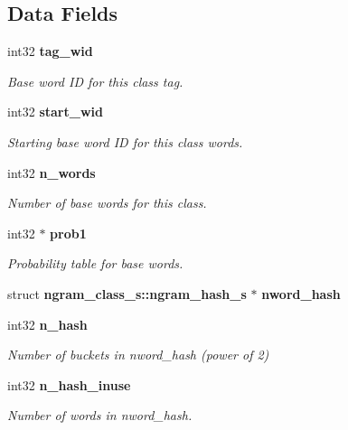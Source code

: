 \subsection*{Data Fields}
\begin{DoxyCompactItemize}
\item 
int32 {\bf tag\+\_\+wid}\label{structngram__class__s_ab5f3cc0142c9fd91b3c3d0e59906b556}

\begin{DoxyCompactList}\small\item\em Base word I\+D for this class tag. \end{DoxyCompactList}\item 
int32 {\bf start\+\_\+wid}\label{structngram__class__s_a370c88602c7c1f7e3ff1a767c027f5cb}

\begin{DoxyCompactList}\small\item\em Starting base word I\+D for this class\textquotesingle{} words. \end{DoxyCompactList}\item 
int32 {\bf n\+\_\+words}\label{structngram__class__s_af13562cbc44647435f315b18df5688dc}

\begin{DoxyCompactList}\small\item\em Number of base words for this class. \end{DoxyCompactList}\item 
int32 $\ast$ {\bf prob1}\label{structngram__class__s_a50077f48f135f1c666745a21574e4205}

\begin{DoxyCompactList}\small\item\em Probability table for base words. \end{DoxyCompactList}\item 
struct {\bf ngram\+\_\+class\+\_\+s\+::ngram\+\_\+hash\+\_\+s} $\ast$ {\bfseries nword\+\_\+hash}\label{structngram__class__s_aab28f6b41e4020455ff2484a6fa850bb}

\item 
int32 {\bf n\+\_\+hash}\label{structngram__class__s_a7f450019eb6dc2e31b18eb3ab6009920}

\begin{DoxyCompactList}\small\item\em Number of buckets in nword\+\_\+hash (power of 2) \end{DoxyCompactList}\item 
int32 {\bf n\+\_\+hash\+\_\+inuse}\label{structngram__class__s_a79438cd582363800bc05da31a9ca49d6}

\begin{DoxyCompactList}\small\item\em Number of words in nword\+\_\+hash. \end{DoxyCompactList}\end{DoxyCompactItemize}


